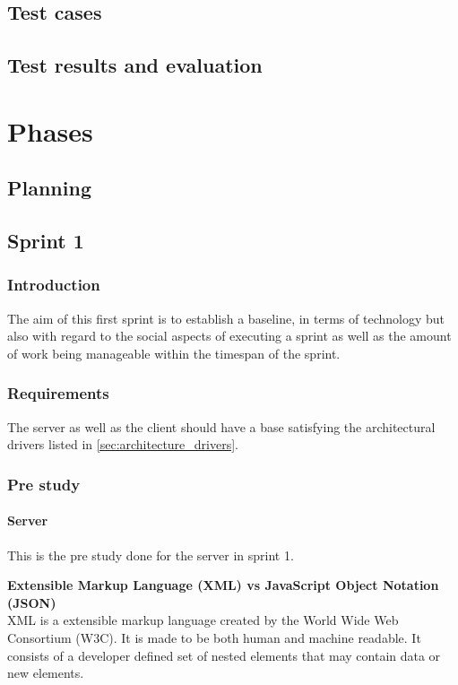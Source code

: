 \documentclass[11pt]{book}
\begin{document}
\section{Test cases} \label{sec:test_cases}

\section{Test results and evaluation}

\chapter{Phases}
\section{Planning}

\section{Sprint 1}
\subsection{Introduction}
The aim of this first sprint is to establish a baseline, in terms of technology but also with regard to the social aspects of executing a sprint as well as the amount of work being manageable within the timespan of the sprint.

\subsection{Requirements}
The server as well as the client should have a base satisfying the architectural drivers listed in \ref{sec:architecture_drivers}.

\subsection{Pre study}

\subsubsection{Server}
This is the pre study done for the server in sprint 1.

\textbf{Extensible Markup Language (XML) vs JavaScript Object Notation (JSON)}\\
XML is a extensible markup language created by the World Wide Web Consortium (W3C). It is made to be both human and machine readable. It consists of a developer defined set of nested elements that may contain data or new elements.
\end{document}
